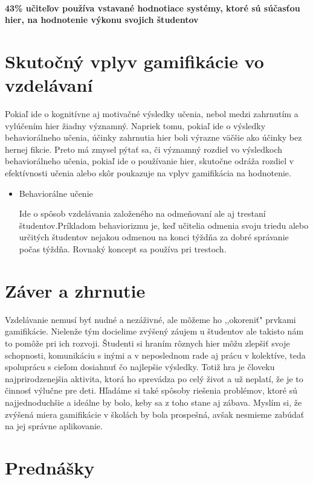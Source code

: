 \documentclass[10pt,twoside,slovak,a4paper]{article}
\begin{document}
\paragraph{43\% učiteľov používa vstavané hodnotiace systémy, ktoré sú súčasťou hier, na hodnotenie výkonu svojich študentov\cite{games}}\label{43}

\section{Skutočný vplyv gamifikácie vo vzdelávaní} 
Pokiaľ ide o kognitívne aj motivačné výsledky učenia, nebol medzi zahrnutím a vylúčením hier žiadny významný. Napriek tomu, pokiaľ ide o výsledky behaviorálneho učenia, účinky zahrnutia hier boli výrazne väčšie ako účinky bez hernej fikcie. Preto má zmysel pýtať sa, či významný rozdiel vo výsledkoch behaviorálneho učenia, pokiaľ ide o používanie hier, skutočne odráža rozdiel v efektívnosti učenia alebo skôr poukazuje na vplyv gamifikácia na hodnotenie.

\begin{itemize}
    \item Behaviorálne učenie

Ide o spôsob vzdelávania založeného na odmeňovaní ale aj trestaní študentov.Príkladom behaviorizmu je, keď učitelia odmenia svoju triedu alebo určitých študentov nejakou odmenou na konci týždňa za dobré správanie počas týždňa. Rovnaký koncept sa používa pri trestoch.
\end{itemize}

\section{Záver a zhrnutie}  
Vzdelávanie nemusí byť nudné a nezáživné, ale môžeme ho ,,okoreniť" prvkami gamifikácie. Nielenže tým docielime zvýšený záujem u študentov ale takisto nám to pomôže pri ich rozvoji. Študenti si hraním rôznych hier môžu zlepšiť svoje schopnosti, komunikáciu s inými a v neposlednom rade aj prácu v kolektíve, teda spoluprácu s cieľom dosiahnuť čo najlepšie výsledky. Totiž hra je človeku najprirodzenejšia aktivita, ktorá ho sprevádza po celý život a už neplatí, že je to činnosť výlučne pre deti. Hľadáme si také spôsoby riešenia problémov, ktoré sú najjednoduchšie a ideálne by bolo, keby sa z toho stane aj zábava.\cite{jakub-Framework} Myslím si, že zvýšená miera gamifikácie v školách by bola prospešná, avšak nesmieme zabúdať na jej správne aplikovanie.

\section{Prednášky}
\end{document}
